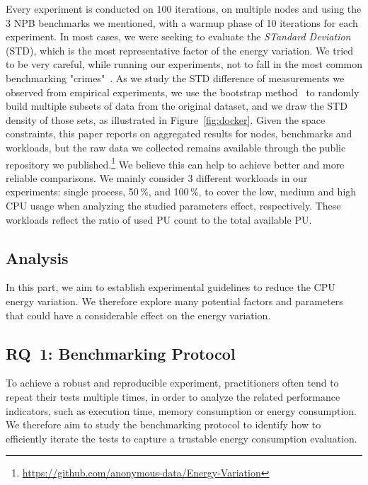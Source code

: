 Every experiment is conducted on $100$ iterations, on multiple nodes and using the 3 NPB benchmarks we mentioned, with a warmup phase of 10 iterations for each experiment.
In most cases, we were seeking to evaluate the \emph{STandard Deviation} (STD), which is the most representative factor of the energy variation.
We tried to be very careful, while running our experiments, not to fall in the most common benchmarking "crimes"~\cite{DBLP:journals/corr/abs-1801-02381}.
As we study the STD difference of measurements we observed from empirical experiments, we use the bootstrap method~\cite{efron2000bootstrap} to randomly build multiple subsets of data from the original dataset, and we draw the STD density of those sets, as illustrated in Figure~\ref{fig:docker}.
Given the space constraints, this paper reports on aggregated results for nodes, benchmarks and workloads, but the raw data we collected remains available through the public repository we published.\footnote{\url{https://github.com/anonymous-data/Energy-Variation}}
We believe this can help to achieve better and more reliable comparisons.
We mainly consider 3 different workloads in our experiments: \textsf{single process}, 50\,\%, and 100\,\%, to cover the low, medium and high CPU usage when analyzing the studied parameters effect, respectively.
These workloads reflect the ratio of used PU count to the total available PU.

\subsection{Analysis}\label{subsec:parameters}
In this part, we aim to establish experimental guidelines to reduce the CPU energy variation.
We therefore explore many potential factors and parameters that could have a considerable effect on the energy variation.


\subsection{\textsc{RQ}~1: Benchmarking Protocol}
To achieve a robust and reproducible experiment, practitioners often tend to repeat their tests multiple times, in order to analyze the related performance indicators, such as execution time, memory consumption or energy consumption.
We therefore aim to study the benchmarking protocol to identify how to efficiently iterate the tests to capture a trustable energy consumption evaluation.

